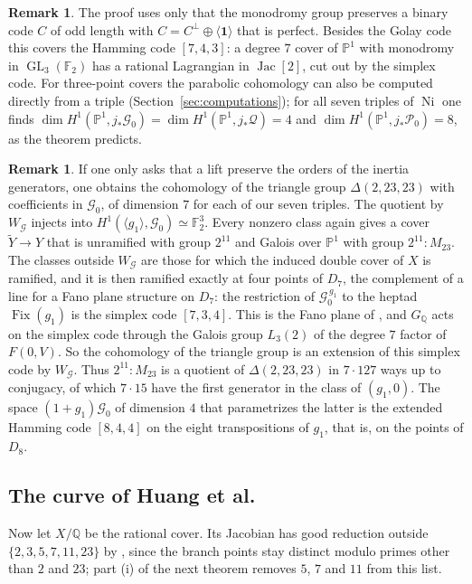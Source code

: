 \documentclass[11pt]{amsart}
\theoremstyle{definition}
\newtheorem{remark}[theorem]{Remark}
\newcommand{\QQ}{\mathbb{Q}}
\newcommand{\FF}{\mathbb{F}}
\newcommand{\PP}{\mathbb{P}}
\newcommand{\Jac}{\operatorname{Jac}}
\newcommand{\Fix}{\operatorname{Fix}}
\newcommand{\GL}{\operatorname{GL}}
\newcommand{\Ni}{\operatorname{Ni}}
\newcommand{\M}{M_{23}}
\newcommand{\cG}{\mathcal{G}}
\newcommand{\cP}{\mathcal{P}}
\newcommand{\cQ}{\mathcal{Q}}
\newcommand{\one}{\mathbf{1}}
\newcommand{\GQ}{G_{\QQ}}
\begin{document}
\begin{remark}\label{rem:hamming}
The proof uses only that the monodromy group preserves a binary code $C$ of odd length with $C=C^\perp\oplus\langle\one\rangle$ that is perfect. Besides the Golay code this covers the Hamming code $[7,4,3]$: a degree $7$ cover of $\PP^1$ with monodromy in $\GL_3(\FF_2)$ has a rational Lagrangian in $\Jac[2]$, cut out by the simplex code. For three-point covers the parabolic cohomology can also be computed directly from a triple (Section~\ref{sec:computations}); for all seven triples of $\Ni$ one finds $\dim H^1(\PP^1,j_*\cG_0)=\dim H^1(\PP^1,j_*\cQ)=4$ and $\dim H^1(\PP^1,j_*\cP_0)=8$, as the theorem predicts.
\end{remark}

\begin{remark}\label{rem:orbifold}
If one only asks that a lift preserve the orders of the inertia generators, one obtains the cohomology of the triangle group $\Delta(2,23,23)$ with coefficients in $\cG_0$, of dimension $7$ for each of our seven triples. The quotient by $W_\cG$ injects into $H^1(\langle g_1\rangle,\cG_0)\simeq\FF_2^3$. Every nonzero class again gives a cover $\widetilde Y\to Y$ that is unramified with group $2^{11}$ and Galois over $\PP^1$ with group $2^{11}{:}\M$. The classes outside $W_\cG$ are those for which the induced double cover of $X$ is ramified, and it is then ramified exactly at four points of $D_7$, the complement of a line for a Fano plane structure on $D_7$: the restriction of $\cG_0^{\,g_1}$ to the heptad $\Fix(g_1)$ is the simplex code $[7,3,4]$. This is the Fano plane of \cite[Thm.~8.5, Prop.~8.8]{LeLay26}, and $\GQ$ acts on the simplex code through the Galois group $L_3(2)$ of the degree $7$ factor of $F(0,V)$. So the cohomology of the triangle group is an extension of this simplex code by $W_\cG$. Thus $2^{11}{:}\M$ is a quotient of $\Delta(2,23,23)$ in $7\cdot127$ ways up to conjugacy, of which $7\cdot15$ have the first generator in the class of $(g_1,0)$. The space $(1+g_1)\cG_0$ of dimension $4$ that parametrizes the latter is the extended Hamming code $[8,4,4]$ on the eight transpositions of $g_1$, that is, on the points of $D_8$.
\end{remark}

\subsection{The curve of Huang et al.}
Now let $X/\QQ$ be the rational cover. Its Jacobian has good reduction outside $\{2,3,5,7,11,23\}$ by \cite{Beckmann89}, since the branch points stay distinct modulo primes other than $2$ and $23$; part (i) of the next theorem removes $5$, $7$ and $11$ from this list.
\end{document}
